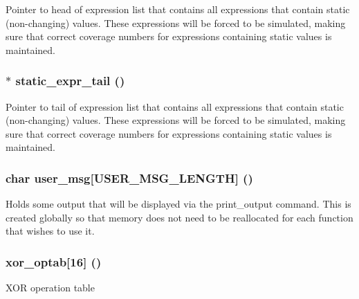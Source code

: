 Pointer to head of expression list that contains all expressions that contain static (non-changing) values. These expressions will be forced to be simulated, making sure that correct coverage numbers for expressions containing static values is maintained. 
\subsubsection{$\ast$ {\bf static\_\-expr\_\-tail} ()}\label{expr_8c_a9}


Pointer to tail of expression list that contains all expressions that contain static (non-changing) values. These expressions will be forced to be simulated, making sure that correct coverage numbers for expressions containing static values is maintained. 
\subsubsection{\setlength{\rightskip}{0pt plus 5cm}char {\bf user\_\-msg}[USER\_\-MSG\_\-LENGTH] ()}\label{expr_8c_a7}


Holds some output that will be displayed via the print\_\-output command. This is created globally so that memory does not need to be reallocated for each function that wishes to use it. 
\subsubsection{ {\bf xor\_\-optab}[16] ()}\label{expr_8c_a0}


XOR operation table 